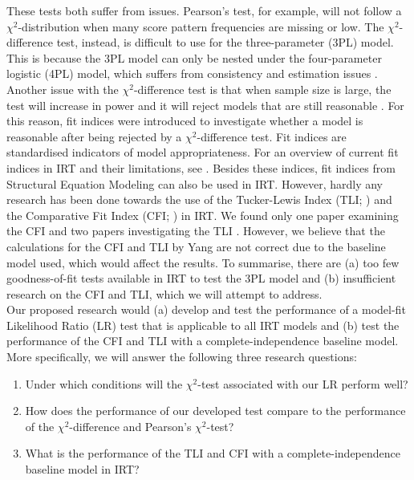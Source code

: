 \documentclass{article}
\begin{document}
These tests both suffer from issues. Pearson's test, for example, will not follow a $\chi^2$-distribution when many score pattern frequencies are missing or low. The $\chi^2$-difference test, instead, is difficult to use for the three-parameter (3PL) model. This is because the 3PL model can only be nested under the four-parameter logistic (4PL) model, which suffers from consistency and estimation issues \autocite{4plconsist1, 4plconsist2}. Another issue with the $\chi^2$-difference test is that when sample size is large, the test will increase in power and it will reject models that are still reasonable \autocite{chi2sens}. For this reason, fit indices were introduced to investigate whether a model is reasonable after being rejected by a $\chi^2$-difference test. 
Fit indices are standardised indicators of model appropriateness. For an overview of current fit indices in IRT and their limitations, see \textcite{ref1}. Besides these indices, fit indices from Structural Equation Modeling can also be used in IRT. However, hardly any research has been done towards the use of the Tucker-Lewis Index (TLI; \cite{tli}) and the Comparative Fit Index (CFI; \cite{cfi}) in IRT. We found only one paper examining the CFI \autocite{yangfitindex} and two papers investigating the TLI \autocite{yangfitindex, tliirt}. However, we believe that the calculations for the CFI and TLI by Yang are not correct due to the baseline model used, which would affect the results. To summarise, there are (a) too few goodness-of-fit tests available in IRT to test the 3PL model and (b) insufficient research on the CFI and TLI, which we will attempt to address. \\
\indent Our proposed research would (a) develop and test the performance of a model-fit Likelihood Ratio (LR) test that is applicable to all IRT models and (b) test the performance of the CFI and TLI with a complete-independence baseline model. More specifically, we will answer the following three research questions:
\begin{enumerate}
\item Under which conditions will the $\chi^2$-test associated with our LR perform well?
\item How does the performance of our developed test compare to the performance of the $\chi^2$-difference and Pearson's $\chi^2$-test?
\item What is the performance of the TLI and CFI with a complete-independence baseline model in IRT?
\end{enumerate}
\end{document}
